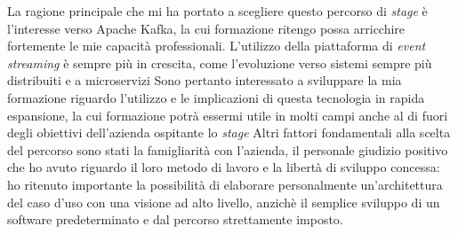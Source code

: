 La ragione principale che mi ha portato a scegliere questo percorso di \textit{stage} è l'interesse verso Apache Kafka, la cui formazione ritengo possa arricchire fortemente le mie capacità professionali.
L'utilizzo della piattaforma di \textit{event streaming} è sempre più in crescita, come l'evoluzione verso sistemi sempre più distribuiti e a microservizi
Sono pertanto interessato a sviluppare la mia formazione riguardo l'utilizzo e le implicazioni di questa tecnologia in rapida espansione, la cui formazione potrà essermi utile in molti campi anche al di fuori degli obiettivi dell'azienda ospitante lo \textit{stage}
Altri fattori fondamentali alla scelta del percorso sono stati la famigliarità con l'azienda, il personale giudizio positivo che ho avuto riguardo il loro metodo di lavoro e la libertà di sviluppo concessa: ho ritenuto importante la possibilità di elaborare personalmente un'architettura del caso d'uso con una visione ad alto livello, anzichè il semplice sviluppo di un software predeterminato e dal percorso strettamente imposto.
